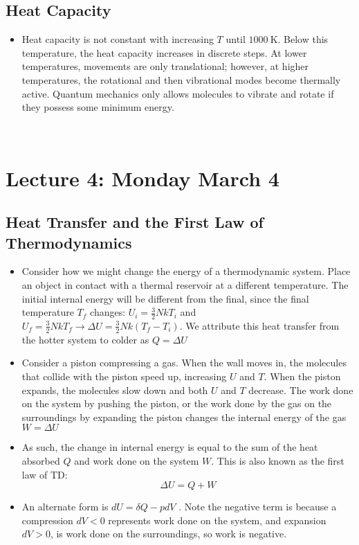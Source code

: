 \documentclass[8pt]{article}
\begin{document}
\subsection{Heat Capacity}
\begin{itemize}
    \item Heat capacity is not constant with increasing $T$ until $1000 \ \text{K}$. Below this temperature, the heat capacity increases in discrete steps. At lower temperatures, movements are only translational; however, at higher temperatures, the rotational and then vibrational modes become thermally active. Quantum mechanics only allows molecules to vibrate and rotate if they possess some minimum energy.
\end{itemize}


\
\section{Lecture 4: Monday March 4}
\subsection{Heat Transfer and the First Law of Thermodynamics}
\begin{itemize}
    \item Consider how we might change the energy of a thermodynamic system. Place an object in contact with a thermal reservoir at a different temperature. The initial internal energy will be different from the final, since the final temperature $T_f$ changes: $U_{i} = \frac{3}{2}NkT_i$  and $U_f = \frac{3}{2}NkT_f \rightarrow \Delta U = \frac{3}{2}Nk(T_f - T_i)$. We attribute this heat transfer from the hotter system to colder as $Q = \Delta U$ 
    \item Consider a piston compressing a gas. When the wall moves in, the molecules that collide with the piston speed up, increasing $U$ and $T$. When the piston expands, the molecules slow down and both $U$ and $T$ decrease. The work done on the system by pushing the piston, or the work done by the gas on the surroundings by expanding the piston changes the internal energy of the gas $W = \Delta U$ 
    \item As such, the change in internal energy is equal to the sum of the heat absorbed $Q$ and work done on the system $W$. This is also known as the first law of TD: \begin{equation}
        \Delta U = Q + W
    \end{equation}
    \item An alternate form is $dU = \delta Q - pdV$ . Note the negative term is because a compression $dV < 0$ represents work done on the system, and expansion $dV > 0$, is work done on the surroundings, so work is negative. 
\end{itemize}
\end{document}
